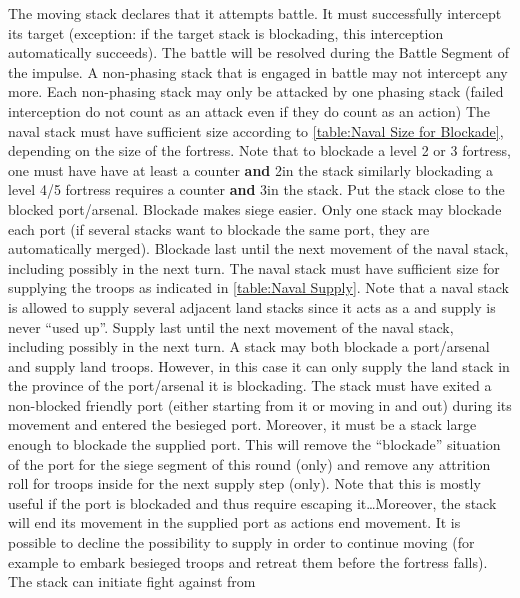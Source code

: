 \bparag[Battle.] The moving stack declares that it attempts battle. It must
successfully intercept its target (exception: if the target stack is
blockading, this interception automatically succeeds). The battle will be
resolved during the Battle Segment of the impulse. A non-phasing stack that is
engaged in battle may not intercept any more. Each non-phasing stack may only
be attacked by one phasing stack (failed interception do not count as an
attack even if they do count as an action)
 The naval stack must have
sufficient size according to \ref{table:Naval Size for Blockade}, depending on
the size of the fortress. Note that to blockade a level 2 or 3 fortress, one
must have have at least a \FLEET\Facemoins counter \textbf{and} 2\ND in the
stack similarly blockading a level 4/5 fortress requires a \FLEET\Faceplus
counter \textbf{and} 3\ND in the stack. Put the stack close to the blocked
port/arsenal. Blockade makes siege easier. Only one stack may blockade each
port (if several stacks want to blockade the same port, they are automatically
merged). Blockade last until the next movement of the naval stack, including
possibly in the next turn.
 The naval stack must have sufficient size for
supplying the troops as indicated in \ref{table:Naval Supply}. Note that a
naval stack is allowed to supply several adjacent land stacks since it acts as
a \SoS and supply is never ``used up''. Supply last until the next movement of
the naval stack, including possibly in the next turn.
 A stack may both blockade a port/arsenal and
supply land troops. However, in this case it can only supply the land stack in
the province of the port/arsenal it is blockading.
 The stack must have exited a non-blocked
friendly port (either starting from it or moving in and out) during its
movement and entered the besieged port. Moreover, it must be a stack large
enough to blockade the supplied port. This will remove the ``blockade''
situation of the port for the siege segment of this round (only) and remove
any attrition roll for troops inside for the next supply step (only). Note
that this is mostly useful if the port is blockaded and thus require escaping
it\ldots Moreover, the stack will end its movement in the supplied port as
actions end movement. It is possible to decline the possibility to supply in
order to continue moving (for example to embark besieged troops and retreat
them before the fortress falls).
 The stack can initiate fight against \corsaire from
